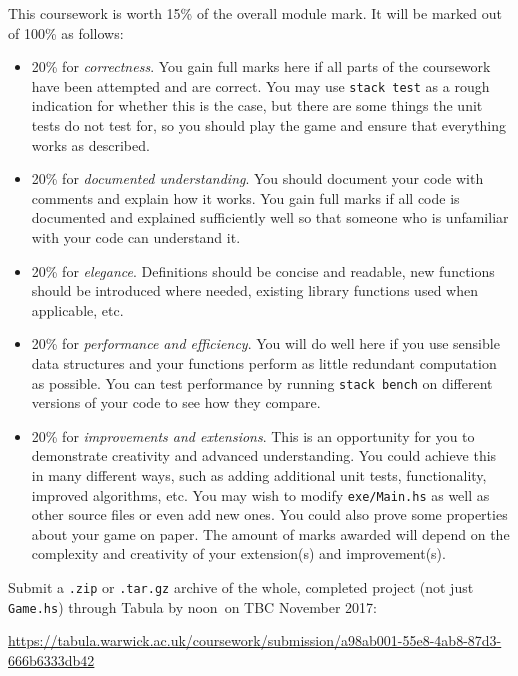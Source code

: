 \documentclass{cs256-shared/cs256}
\newcommand{\deadlineTime}{noon}
\newcommand{\deadlineDate}{TBC November 2017}
\newcommand{\submissionURL}{https://tabula.warwick.ac.uk/coursework/submission/a98ab001-55e8-4ab8-87d3-666b6333db42}
\begin{document}
This coursework is worth 15\% of the overall module mark. It will be marked out of 100\% as follows:
\begin{itemize}
\item 20\% for \emph{correctness}. You gain full marks here if all parts of the coursework have been attempted and are correct. You may use \texttt{stack test} as a rough indication for whether this is the case, but there are some things the unit tests do not test for, so you should play the game and ensure that everything works as described.
\item 20\% for \emph{documented understanding}. You should document your code with comments and explain how it works. You gain full marks if all code is documented and explained sufficiently well so that someone who is unfamiliar with your code can understand it.
\item 20\% for \emph{elegance}. Definitions should be concise and readable, new functions should be introduced where needed, existing library functions used when applicable, etc. 
\item 20\% for \emph{performance and efficiency}. You will do well here if you use sensible data structures and your functions perform as little redundant computation as possible. You can test performance by running \texttt{stack bench} on different versions of your code to see how they compare. 
\item 20\% for \emph{improvements and extensions}. This is an opportunity for you to demonstrate creativity and advanced understanding. You could achieve this in many different ways, such as adding additional unit tests, functionality, improved algorithms, etc. You may wish to modify \texttt{exe/Main.hs} as well as other source files or even add new ones. You could also prove some properties about your game on paper. The amount of marks awarded will depend on the complexity and creativity of your extension(s) and improvement(s).
\end{itemize}
Submit a \texttt{.zip} or \texttt{.tar.gz} archive of the whole, completed project (not just \texttt{Game.hs}) through Tabula by \deadlineTime\ on \deadlineDate:
\begin{center} 
	\url{\submissionURL}
\end{center}
\end{document}

